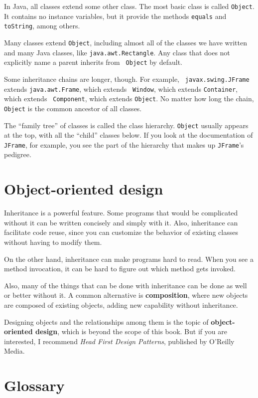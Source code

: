 \documentclass[12pt]{book}
\theoremstyle{definition}
\begin{document}
In Java, all classes extend some other class.  The most basic class is
called {\tt Object}.  It contains no instance variables, but it
provide the methods {\tt equals} and {\tt toString}, among others.

Many classes extend {\tt Object}, including almost all of the classes
we have written and many Java classes, like {\tt java.awt.Rectangle}.
Any class that does not explicitly name a parent inherits from {\tt
  Object} by default.

Some inheritance chains are longer, though.  For example, {\tt
  javax.swing.JFrame} extends {\tt java.awt.Frame}, which extends {\tt
  Window}, which extends {\tt Container}, which extends {\tt
  Component}, which extends {\tt Object}.  No matter how long the
chain, {\tt Object} is the common ancestor of all classes.

The ``family tree'' of classes is called the class hierarchy.  {\tt Object}
usually appears at the top, with all the ``child'' classes below.  If
you look at the documentation of {\tt JFrame}, for example, you
see the part of the hierarchy that makes up {\tt JFrame}'s pedigree.


\section {Object-oriented design}

Inheritance is a powerful feature.  Some programs that would be
complicated without it can be written concisely and simply
with it.  Also, inheritance can facilitate code reuse, since you can
customize the behavior of existing classes without having to modify
them.

On the other hand, inheritance can make programs hard to read.  When
you see a method invocation, it can be hard to figure out which method
gets invoked.

Also, many of the things that can be done with inheritance can
be done as well or better without it.  
A common alternative is {\bf composition}, where new objects are
composed of existing objects, adding new capability without
inheritance.

Designing objects and the relationships among them is the topic
of {\bf object-oriented design}, which is beyond the scope of this
book.  But if you are interested, I recommend {\em Head First Design
Patterns}, published by O'Reilly Media.


\section{Glossary}
\end{document}
